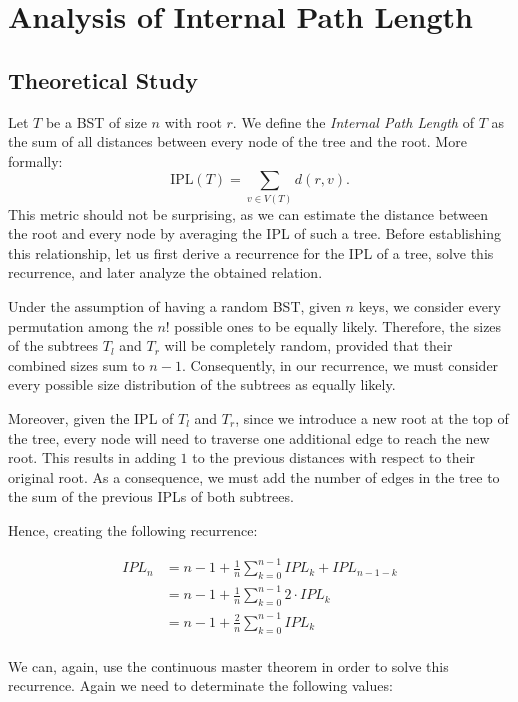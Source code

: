 \section{Analysis of Internal Path Length}
\subsection{Theoretical Study}
Let \( T \) be a BST of size \( n \) with root \( r \). We define the \textit{Internal Path Length} of \( T \) as the sum of all distances between every node of the tree and the root. More formally:  
\[
\text{IPL}(T) = \sum\limits_{v \in V(T)} d(r,v).
\]
This metric should not be surprising, as we can estimate the distance between the root and every node by averaging the IPL of such a tree. Before establishing this relationship, let us first derive a recurrence for the IPL of a tree, solve this recurrence, and later analyze the obtained relation.

Under the assumption of having a random BST, given \( n \) keys, we consider every permutation among the \( n! \) possible ones to be equally likely. Therefore, the sizes of the subtrees \( T_l \) and \( T_r \) will be completely random, provided that their combined sizes sum to \( n - 1 \). Consequently, in our recurrence, we must consider every possible size distribution of the subtrees as equally likely.

Moreover, given the IPL of \( T_l \) and \( T_r \), since we introduce a new root at the top of the tree, every node will need to traverse one additional edge to reach the new root. This results in adding \( 1 \) to the previous distances with respect to their original root. As a consequence, we must add the number of edges in the tree to the sum of the previous IPLs of both subtrees.

Hence, creating the following recurrence:

\begin{align*}
    IPL_n &= n - 1 + \frac{1}{n}\sum\limits_{k = 0}^{n-1} IPL_k + IPL_{n-1-k} \\
        &= n - 1 + \frac{1}{n}\sum\limits_{k = 0}^{n-1} 2 \cdot IPL_k \\
        &= n - 1 + \frac{2}{n}\sum\limits_{k = 0}^{n-1} IPL_k \\
\end{align*}

We can, again, use the continuous master theorem in order to solve this recurrence. Again we need to determinate the following values:

